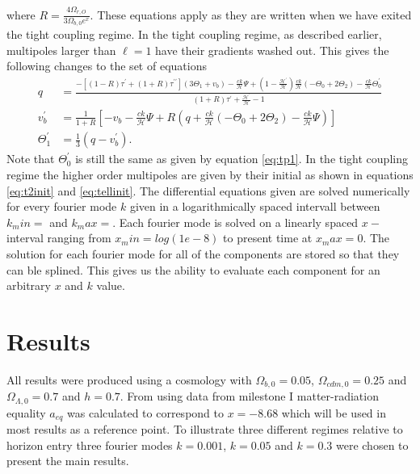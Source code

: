 \documentclass[onecolumn]{aastex62}
\begin{document}
where $R = \frac{4\Omega_{r,O}}{3\Omega_{b,0}e^x}$. These equations apply as they are written when we have exited the tight coupling regime. In the tight coupling regime, as described earlier, multipoles larger than $\ell=1$ have their gradients washed out. This gives the following changes to the set of equations 
\begin{align}
    q &= \frac{-[(1-R)\tau^\prime + (1+R)\tau^{\prime\prime}](3\Theta_1+v_b) -
    \frac{ck}{\mathcal{H}}\Psi + (1-\frac{\mathcal{H}^\prime}{\mathcal{H}})\frac{ck}{\mathcal{H}}(-\Theta_0 +
    2\Theta_2) - \frac{ck}{\mathcal{H}}\Theta_0^\prime}{(1+R)\tau^\prime + \frac{\mathcal{H}^\prime}{\mathcal{H}} -
    1}\\
    v_b^\prime &= \frac{1}{1+R} \left[-v_b - \frac{ck}{\mathcal{H}}\Psi + R(q +
    \frac{ck}{\mathcal{H}}(-\Theta_0 + 2\Theta_2) - \frac{ck}{\mathcal{H}}\Psi)\right]\\
    \Theta^\prime_1 &= \frac{1}{3} (q - v_b^\prime).
\end{align}
Note that $\Theta^\prime_0$ is still the same as given by equation \ref{eq:tp1}.  In the tight coupling regime the higher order multipoles are given by their initial as shown in equations \ref{eq:t2init} and \ref{eq:tellinit}. The differential equations given are solved numerically for every fourier mode $k$ given in a logarithmically spaced intervall between $k_min=$ and $k_max=$. Each fourier mode is solved on a linearly spaced $x-$interval ranging from $x_min=log(1e-8)$ to present time at $x_max=0$. The solution for each fourier mode for all of the components are stored so that they can ble splined. This gives us the ability to evaluate each component for an arbitrary $x$ and $k$ value.
\section{Results}
\label{sec:results}
All results were produced using a cosmology with $\Omega_{b,0}=0.05$, $\Omega_{cdm,0}=0.25$ and $\Omega_{\Lambda,0}=0.7$ and $h=0.7$. From using data from milestone I matter-radiation equality $a_{eq}$ was calculated to correspond to $x=-8.68$ which will be used in most results as a reference point. To illustrate three different regimes relative to horizon entry three fourier modes $k=0.001$, $k=0.05$ and $k=0.3$ were chosen to present the main results.
\end{document}

